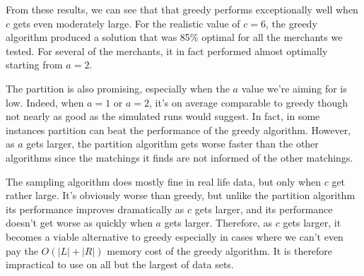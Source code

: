 From these results, we can see that that greedy performs exceptionally well when $c$ gets even moderately large.
For the realistic value of $c=6$, the greedy algorithm produced a solution that was 85\% optimal for all the
merchants we tested. For several of the merchants, it in fact performed almost optimally starting from $a=2$. \vs

The partition is also promising, especially when the $a$ value we're aiming for is low. Indeed, when $a=1$ or $a=2$,
it's on average comparable to greedy though not nearly as good as the simulated runs would suggest. In fact, in some
instances partition can beat the performance of the greedy algorithm. However, as $a$ gets larger, the partition
algorithm gets worse faster than the other algorithms since the matchings it finds are not informed of the other
matchings. \vs

The sampling algorithm does mostly fine in real life data, but only when $c$ get rather large. It's obviously worse
than greedy, but unlike the partition algorithm its performance improves dramatically as $c$ gets larger, and its 
performance doesn't get worse as quickly when $a$ gets larger. Therefore, as $c$ gets larger, it becomes a viable
alternative to greedy especially in cases where we can't even pay the $O(|L|+|R|)$ memory cost of the greedy algorithm.
It is therefore impractical to use on all but the largest of data sets.
